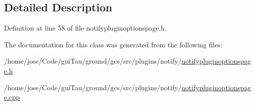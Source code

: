\subsection{Detailed Description}


Definition at line 58 of file notifypluginoptionspage.\-h.



The documentation for this class was generated from the following files\-:\begin{DoxyCompactItemize}
\item 
/home/jose/\-Code/gui\-Tau/ground/gcs/src/plugins/notify/\hyperlink{notifypluginoptionspage_8h}{notifypluginoptionspage.\-h}\item 
/home/jose/\-Code/gui\-Tau/ground/gcs/src/plugins/notify/\hyperlink{notifypluginoptionspage_8cpp}{notifypluginoptionspage.\-cpp}\end{DoxyCompactItemize}

